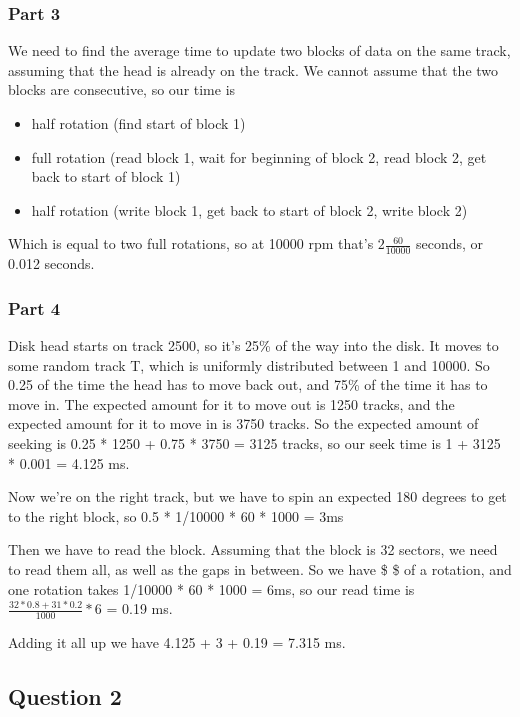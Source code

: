 \documentclass[
  letterpaper,
  DIV=11,
  numbers=noendperiod]{scrartcl}
\providecommand{\tightlist}{%
  \setlength{\itemsep}{0pt}\setlength{\parskip}{0pt}}\usepackage{longtable,booktabs,array}
\begin{document}
\hypertarget{part-3}{%
\subsubsection{Part 3}\label{part-3}}

We need to find the average time to update two blocks of data on the
same track, assuming that the head is already on the track. We cannot
assume that the two blocks are consecutive, so our time is

\begin{itemize}
\tightlist
\item
  half rotation (find start of block 1)
\item
  full rotation (read block 1, wait for beginning of block 2, read block
  2, get back to start of block 1)
\item
  half rotation (write block 1, get back to start of block 2, write
  block 2)
\end{itemize}

Which is equal to two full rotations, so at 10000 rpm that's
\(2\frac{60}{10000}\) seconds, or 0.012 seconds.

\hypertarget{part-4}{%
\subsubsection{Part 4}\label{part-4}}

Disk head starts on track 2500, so it's 25\% of the way into the disk.
It moves to some random track T, which is uniformly distributed between
1 and 10000. So 0.25 of the time the head has to move back out, and 75\%
of the time it has to move in. The expected amount for it to move out is
1250 tracks, and the expected amount for it to move in is 3750 tracks.
So the expected amount of seeking is 0.25 * 1250 + 0.75 * 3750 = 3125
tracks, so our seek time is 1 + 3125 * 0.001 = 4.125 ms.

Now we're on the right track, but we have to spin an expected 180
degrees to get to the right block, so 0.5 * 1/10000 * 60 * 1000 = 3ms

Then we have to read the block. Assuming that the block is 32 sectors,
we need to read them all, as well as the gaps in between. So we have
\$ \$ of a rotation, and one rotation
takes 1/10000 * 60 * 1000 = 6ms, so our read time is
\(\frac{32 * 0.8 + 31 * 0.2}{1000} * 6\) = 0.19 ms.

Adding it all up we have 4.125 + 3 + 0.19 = 7.315 ms.

\hypertarget{question-2}{%
\subsection{Question 2}\label{question-2}}
\end{document}
